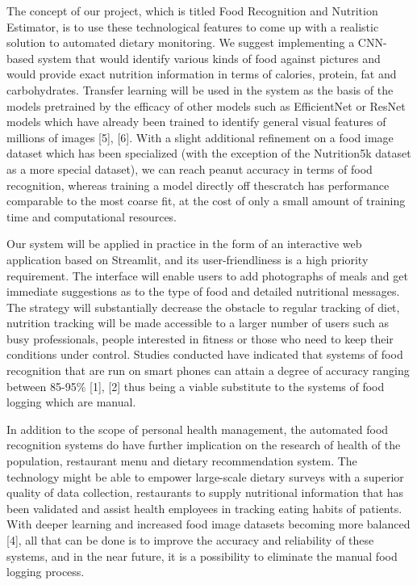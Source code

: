 \documentclass[12pt, openany]{report}
\begin{document}
The concept of our project, which is titled Food Recognition and Nutrition Estimator, is to use these technological features to come up with a realistic solution to automated dietary monitoring. We suggest implementing a CNN-based system that would identify various kinds of food against pictures and would provide exact nutrition information in terms of calories, protein, fat and carbohydrates. Transfer learning will be used in the system as the basis of the models pretrained by the efficacy of other models such as EfficientNet or ResNet models which have already been trained to identify general visual features of millions of images [5], [6]. With a slight additional refinement on a food image dataset which has been specialized (with the exception of the Nutrition5k dataset as a more special dataset), we can reach peanut accuracy in terms of food recognition, whereas training a model directly off thescratch has performance comparable to the most coarse fit, at the cost of only a small amount of training time and computational resources.

Our system will be applied in practice in the form of an interactive web application based on Streamlit, and its user-friendliness is a high priority requirement. The interface will enable users to add photographs of meals and get immediate suggestions as to the type of food and detailed nutritional messages. The strategy will substantially decrease the obstacle to regular tracking of diet, nutrition tracking will be made accessible to a larger number of users such as busy professionals, people interested in fitness or those who need to keep their conditions under control. Studies conducted have indicated that systems of food recognition that are run on smart phones can attain a degree of accuracy ranging between 85-95\% [1], [2] thus being a viable substitute to the systems of food logging which are manual.

In addition to the scope of personal health management, the automated food recognition systems do have further implication on the research of health of the population, restaurant menu and dietary recommendation system. The technology might be able to empower large-scale dietary surveys with a superior quality of data collection, restaurants to supply nutritional information that has been validated and assist health employees in tracking eating habits of patients. With deeper learning and increased food image datasets becoming more balanced [4], all that can be done is to improve the accuracy and reliability of these systems, and in the near future, it is a possibility to eliminate the manual food logging process.
\end{document}
